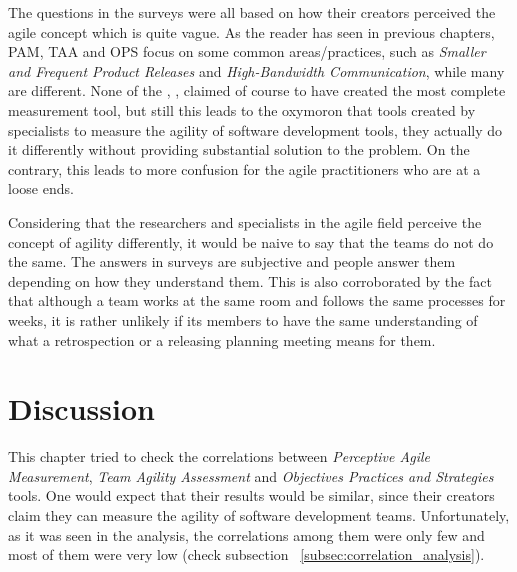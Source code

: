 The questions in the surveys were all based on how their creators perceived the agile concept which is quite vague. As the reader has seen in previous chapters, PAM, TAA and OPS focus on some common areas/practices, such as  \textit{Smaller and Frequent Product Releases} and \textit{High-Bandwidth Communication}, while many are different. None of the \citet{sventha_dissertation}, \citet{pam}, \citet{Leffingwell} claimed of course to have created the most complete measurement tool, but still this leads to the oxymoron that tools created by specialists to measure the agility of software development tools, they actually do it differently without providing substantial solution to the problem. On the contrary, this leads to more confusion for the agile practitioners who are at a loose ends.

Considering that the researchers and specialists in the agile field perceive the concept of agility differently, it would be naive to say that the teams do not do the same. The answers in surveys are subjective and people answer them depending on how they understand them. This is also corroborated by the fact that although a team works at the same room and follows the same processes for weeks, it is rather unlikely if its members to have the same understanding of what a retrospection or a releasing planning meeting means for them.

\section{Discussion}
This chapter tried to check the correlations between \textit{Perceptive Agile Measurement}, \textit{Team Agility Assessment} and \textit{Objectives Practices and Strategies} tools. One would expect that their results would be similar, since their creators claim they can measure the agility of software development teams. Unfortunately, as it was seen in the analysis, the correlations among them were only few and most of them were very low (check subsection ~\ref{subsec:correlation_analysis}).



